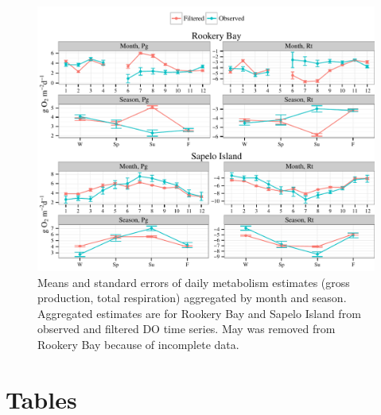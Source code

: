 \documentclass[letterpaper,12pt,oneside]{article}\usepackage[]{graphicx}\usepackage[]{color}
\makeatletter
\def\maxwidth{ %
  \ifdim\Gin@nat@width>\linewidth
    \linewidth
  \else
    \Gin@nat@width
  \fi
}
\newenvironment{knitrout}{}{} %
\makeatother
\begin{document}
\centering\vspace*{\fill}
\begin{knitrout}
\color{fgcolor}\begin{figure}[!ht]


{\centering \includegraphics[width=\maxwidth]{figure/metab_sum2} 

}

\caption[Means and standard errors of daily metabolism estimates (gross production, total respiration) aggregated by month and season]{Means and standard errors of daily metabolism estimates (gross production, total respiration) aggregated by month and season.  Aggregated estimates are for Rookery Bay and Sapelo Island from observed and filtered \ac{DO} time series.  May was removed from Rookery Bay because of incomplete data.\label{fig:metab_sum2}}
\end{figure}


\end{knitrout}
\vfill
\clearpage


\section{Tables}
\end{document}
